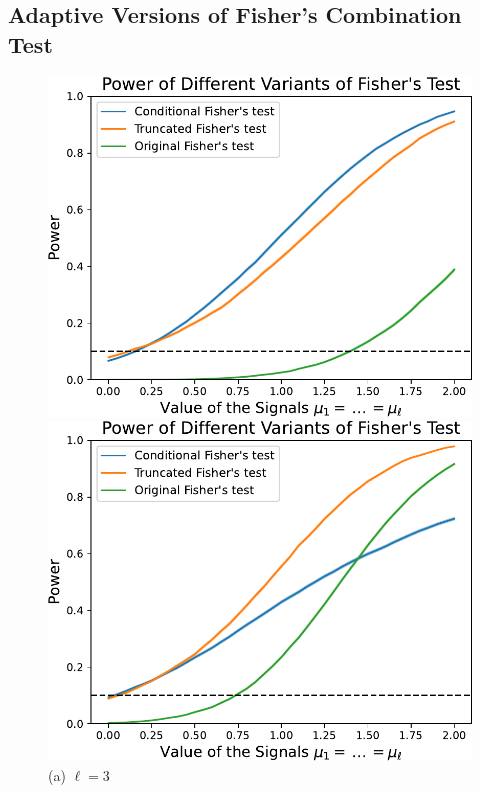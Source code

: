 \documentclass{article}
\begin{document}
\subsection{Adaptive Versions of Fisher's Combination Test}

\begin{figure}
    \centering
    \hspace{-0.035\textwidth}
    \begin{minipage}{0.32\textwidth}
        \centering
        \includegraphics[width=\textwidth]{fig/fisher_ell=3.pdf}
        \caption*{(a) $\ell=3$}
    \end{minipage}
    \hfill
    \hspace{0.01\textwidth}
    \begin{minipage}{0.32\textwidth}
        \centering
        \includegraphics[width=\textwidth]{fig/fisher_ell=5.pdf}

\end{minipage}
\end{figure}
\end{document}
